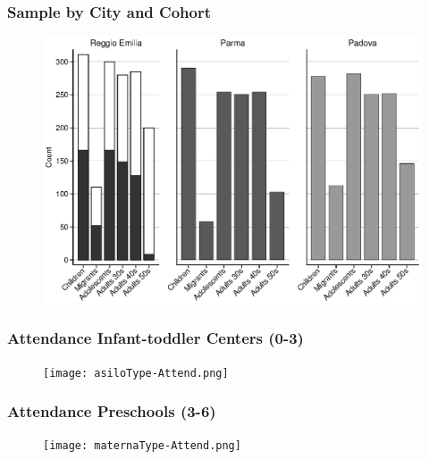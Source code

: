 \begin{frame} 
\frametitle{Sample by City and Cohort}
\begin{figure}[H]
\begin{center}
	\includegraphics[width=.8\textwidth]{./include/sample}
\end{center}
\end{figure}
\end{frame}
\begin{frame}
\frametitle{Attendance Infant-toddler Centers (0-3)} 
\begin{center}
\begin{figure}
\texttt{[image: asiloType-Attend.png]}
\end{figure}
\end{center}
\end{frame}
\begin{frame}
\frametitle{Attendance Preschools (3-6)} 
\begin{center}
\begin{figure}
\texttt{[image: maternaType-Attend.png]}
\end{figure}
\end{center}
\end{frame}
